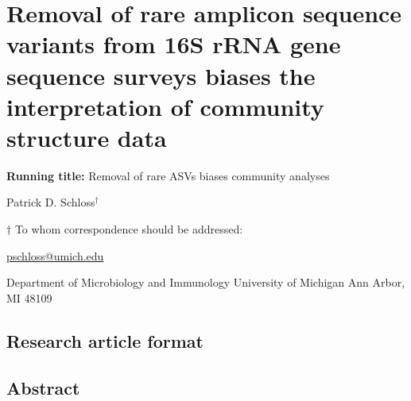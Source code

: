 \documentclass[
]{article}
\author{}
\date{\vspace{-2.5em}}
\begin{document}
\hypertarget{removal-of-rare-amplicon-sequence-variants-from-16s-rrna-gene-sequence-surveys-biases-the-interpretation-of-community-structure-data}{%
\section{Removal of rare amplicon sequence variants from 16S rRNA gene
sequence surveys biases the interpretation of community structure
data}\label{removal-of-rare-amplicon-sequence-variants-from-16s-rrna-gene-sequence-surveys-biases-the-interpretation-of-community-structure-data}}

\vspace{10mm}

\textbf{Running title:} Removal of rare ASVs biases community analyses

\vspace{25mm}

Patrick D. Schloss\({^\dagger}\)

\vspace{40mm}

\(\dagger\) To whom correspondence should be addressed:

\href{mailto:pschloss@umich.edu}{pschloss@umich.edu}

Department of Microbiology and Immunology University of Michigan Ann
Arbor, MI 48109

\vspace{35mm}

\hypertarget{research-article-format}{%
\subsection{Research article format}\label{research-article-format}}

\newpage

\hypertarget{abstract}{%
\subsection{Abstract}\label{abstract}}
\end{document}
